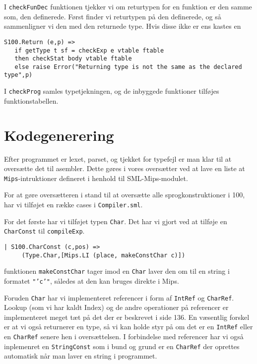 \documentclass[12pt]{article}
\begin{document}
I \texttt{checkFunDec} funktionen tjekker vi om returtypen for en funktion er
den samme som, den definerede. Først finder vi returtypen på den definerede, og
så sammenligner vi den med den returnede type. Hvis disse ikke er ens kastes en

\begin{verbatim}
S100.Return (e,p) => 
   if getType t sf = checkExp e vtable ftable
   then checkStat body vtable ftable
   else raise Error("Returning type is not the same as the declared type",p)
\end{verbatim}

I \texttt{checkProg} samles typetjekningen, og de inbyggede funktioner tilføjes
funktionstabellen.

\section{Kodegenerering}
Efter programmet er lexet, parset, og tjekket for typefejl er man klar til at
oversætte det til asembler. Dette gøres i vores oversætter ved at lave en liste
at \texttt{Mips}-intruktioner defineret i henhold til SML-Mips-modulet.

For at gøre oversætteren i stand til at oversætte alle sprogkonstruktioner i
100, har vi tilføjet en række cases i \texttt{Compiler.sml}.

For det første har vi tilføjet typen \texttt{Char}. Det har vi gjort ved at
tilføje en \texttt{CharConst} til \texttt{compileExp}.

\begin{verbatim}
| S100.CharConst (c,pos) =>
     (Type.Char,[Mips.LI (place, makeConstChar c)])
\end{verbatim}

funktionen \texttt{makeConstChar} tager imod en \texttt{Char} laver den om til en
string i formatet \texttt{"'c'"}, således at den kan bruges direkte i Mips.

Foruden \texttt{Char} har vi implementeret referencer i form af \texttt{IntRef}
og \texttt{CharRef}. Lookup (som vi har kaldt Index) og de andre operationer på
referencer er implementeret meget tæt på det der er beskrevet i
\cite{Mogensen11} side 136. En væsentlig forskel er at vi også returnerer en
type, så vi kan holde styr på om det er en \texttt{IntRef} eller en
\texttt{CharRef} senere hen i oversættelsen. I forbindelse med referencer har vi
også inplemenret en \texttt{StringConst} som i bund og grund er en
\texttt{CharRef} der oprettes automatisk når man laver en string i programmet.
\end{document}
